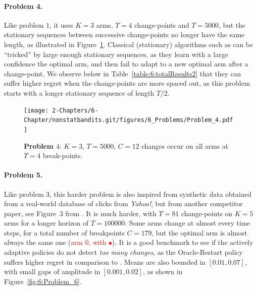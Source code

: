 \paragraph{Problem 4.}

Like problem $1$, it uses $K=3$ arms, $\Upsilon=4$ change-points and $T=5000$,
but the stationary sequences between successive change-points no longer have the same length, as illustrated in Figure~\ref{fig:6:Problem_4}.
Classical (stationary) algorithms such as \klUCB{} can be ``tricked'' by large enough stationary sequences, as they learn with a large confidence the optimal arm, and then fail to adapt to a new optimal arm after a change-point.
We observe below in Table~\ref{table:6:totalResults2} that they can suffer higher regret when the change-points are more spaced out, as this problem starts with a longer stationary sequence of length $T/2$.

\begin{figure}[h!]  %
    \centering
    \texttt{[image: 2-Chapters/6-Chapter/nonstatbandits.git/figures/6\_Problems/Problem\_4.pdf]}
    \caption{\textbf{Problem $4$}: $K=3$, $T=5000$, $C=12$ changes occur on all arms at $\Upsilon=4$ break-points.}
    \label{fig:6:Problem_4}
\end{figure}


\paragraph{Problem 5.}

Like problem $3$, this harder problem is also inspired from synthetic data obtained from a real-world database of clicks from \emph{Yahoo!}, but from another competitor paper, see Figure~3 from \cite{LiuLeeShroff17}.
%
It is much harder, with $\Upsilon=81$ change-points on $K=5$ arms for a longer horizon of $T=100000$.
Some arms change at almost every time steps, for a total number of breakpoints $C=179$, but the optimal arm is almost always the same one (\textcolor{red}{arm $0$, with $\bullet$}).
It is a good benchmark to see if the actively adaptive policies do not detect \emph{too many changes}, as the Oracle-Restart policy suffers higher regret in comparison to \klUCB.
Means are also bounded in $[0.01, 0.07]$, with small gaps of amplitude in $[0.001, 0.02]$,
as shown in Figure~\ref{fig:6:Problem_6}.

